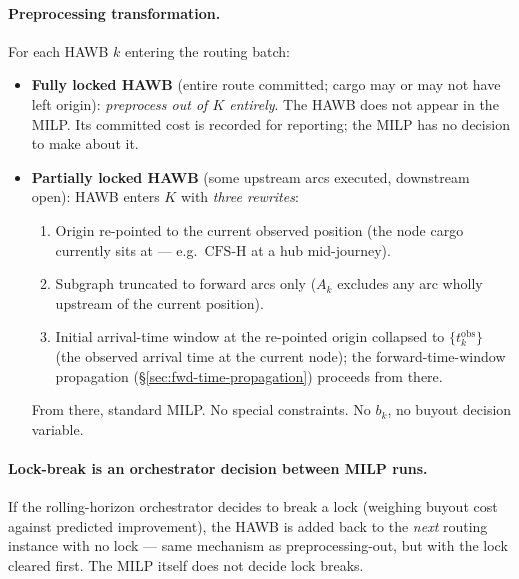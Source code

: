 \documentclass[11pt,a4paper]{article}
\theoremstyle{definition}
\begin{document}
\paragraph{Preprocessing transformation.}
For each HAWB $k$ entering the routing batch:
\begin{itemize}[noitemsep]
  \item \textbf{Fully locked HAWB} (entire route committed; cargo may or may
        not have left origin): \emph{preprocess out of $K$ entirely}. The
        HAWB does not appear in the MILP. Its committed cost is recorded for
        reporting; the MILP has no decision to make about it.
  \item \textbf{Partially locked HAWB} (some upstream arcs executed,
        downstream open): HAWB enters $K$ with \emph{three rewrites}:
        \begin{enumerate}[noitemsep,label=(\arabic*)]
          \item Origin re-pointed to the current observed position (the node
                cargo currently sits at --- e.g.\ $\text{CFS-H}$ at a hub mid-journey).
          \item Subgraph truncated to forward arcs only ($A_k$ excludes any
                arc wholly upstream of the current position).
          \item Initial arrival-time window at the re-pointed origin
                collapsed to $\{t_k^{\text{obs}}\}$ (the observed arrival time
                at the current node); the forward-time-window propagation
                (\S\ref{sec:fwd-time-propagation}) proceeds from there.
        \end{enumerate}
        From there, standard MILP. No special constraints. No $b_k$, no
        buyout decision variable.
\end{itemize}

\paragraph{Lock-break is an orchestrator decision between MILP runs.}
If the rolling-horizon orchestrator decides to break a lock (weighing
buyout cost against predicted improvement), the HAWB is added back to the
\emph{next} routing instance with no lock --- same mechanism as
preprocessing-out, but with the lock cleared first. The MILP itself does not
decide lock breaks.
\end{document}

